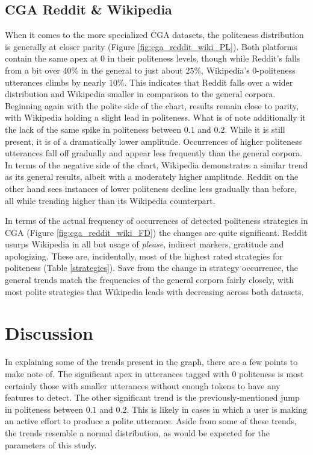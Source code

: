 \documentclass{article}
\begin{document}
\subsection{CGA Reddit \& Wikipedia}
When it comes to the more specialized CGA datasets, the politeness distribution is generally at closer parity (Figure \ref{fig:cga_reddit_wiki_PL}). Both platforms contain the same apex at $0$ in their politeness levels, though while Reddit's falls from a bit over $40\%$ in the general to just about $25\%$, Wikipedia's 0-politeness utterances climbs by nearly $10\%$. This indicates that Reddit falls over a wider distribution and Wikipedia smaller in comparison to the general corpora. Beginning again with the polite side of the chart, results remain close to parity, with Wikipedia holding a slight lead in politeness. What is of note additionally it the lack of the same spike in politeness between $0.1$ and $0.2$. While it is still present, it is of a dramatically lower amplitude. Occurrences of higher politeness utterances fall off gradually and appear less frequently than the general corpora. In terms of the negative side of the chart, Wikipedia demonstrates a similar trend as its general results, albeit with a moderately higher amplitude. Reddit on the other hand sees instances of lower politeness decline less gradually than before, all while trending higher than its Wikipedia counterpart.

In terms of the actual frequency of occurrences of detected politeness strategies in CGA (Figure \ref{fig:cga_reddit_wiki_FD}) the changes are quite significant. Reddit usurps Wikipedia in all but usage of \textit{please}, indirect markers, gratitude and apologizing. These are, incidentally, most of the highest rated strategies for politeness (Table \ref{strategies}). Save from the change in strategy occurrence, the general trends match the frequencies of the general corpora fairly closely, with most polite strategies that Wikipedia leads with decreasing across both datasets.

\section{Discussion}
In explaining some of the trends present in the graph, there are a few points to make note of. The significant apex in utterances tagged with 0 politeness is most certainly those with smaller utterances without enough tokens to have any features to detect. The other significant trend is the previously-mentioned jump in politeness between $0.1$ and $0.2$. This is likely in cases in which a user is making an active effort to produce a polite utterance. Aside from some of these trends, the trends resemble a normal distribution, as would be expected for the parameters of this study.
\end{document}
